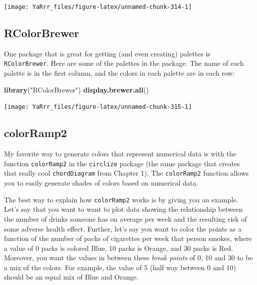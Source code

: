 \documentclass[]{book}
\newenvironment{Shaded}{\begin{snugshade}}{\end{snugshade}}
\newcommand{\KeywordTok}[1]{\textcolor[rgb]{0.13,0.29,0.53}{\textbf{#1}}}
\newcommand{\StringTok}[1]{\textcolor[rgb]{0.31,0.60,0.02}{#1}}
\newcommand{\NormalTok}[1]{#1}
\theoremstyle{definition}
\theoremstyle{definition}
\theoremstyle{remark}
\begin{document}
\begin{center}\texttt{[image: YaRrr\_files/figure-latex/unnamed-chunk-314-1]} \end{center}

\subsection{RColorBrewer}\label{rcolorbrewer}

One package that is great for getting (and even creating) palettes is
\texttt{RColorBrewer}. Here are some of the palettes in the package. The
name of each palette is in the first column, and the colors in each
palette are in each row:

\begin{Shaded}
\begin{Highlighting}[]
\KeywordTok{library}\NormalTok{(}\StringTok{"RColorBrewer"}\NormalTok{)}
\KeywordTok{display.brewer.all}\NormalTok{()}
\end{Highlighting}
\end{Shaded}

\begin{center}\texttt{[image: YaRrr\_files/figure-latex/unnamed-chunk-315-1]} \end{center}

\subsection{colorRamp2}\label{colorramp2}

My favorite way to generate colors that represent numerical data is with
the function \texttt{colorRamp2} in the \texttt{circlize} package (the
same package that creates that really cool \texttt{chordDiagram} from
Chapter 1). The \texttt{colorRamp2} function allows you to easily
generate shades of colors based on numerical data.

The best way to explain how \texttt{colorRamp2} works is by giving you
an example. Let's say that you want to want to plot data showing the
relationship between the number of drinks someone has on average per
week and the resulting risk of some adverse health effect. Further,
let's say you want to color the points as a function of the number of
packs of cigarettes per week that person smokes, where a value of 0
packs is colored Blue, 10 packs is Orange, and 30 packs is Red.
Moreover, you want the values in between these \emph{break points} of 0,
10 and 30 to be a mix of the colors. For example, the value of 5 (half
way between 0 and 10) should be an equal mix of Blue and Orange.
\end{document}
